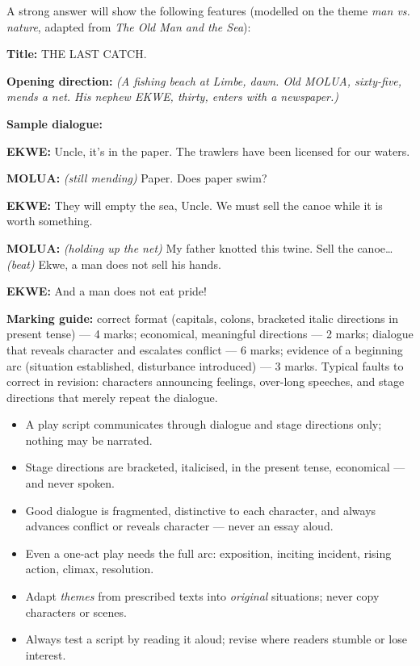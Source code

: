 \documentclass[11pt]{article}
\newcommand{\cle}[1]{{\popxbold\color{popdark}#1}}
\begin{document}
\begin{corrige}
A strong answer will show the following features (modelled on the theme \emph{man vs. nature}, adapted from \emph{The Old Man and the Sea}):\par
\textbf{Title:} THE LAST CATCH.\par
\textbf{Opening direction:} \emph{(A fishing beach at Limbe, dawn. Old MOLUA, sixty-five, mends a net. His nephew EKWE, thirty, enters with a newspaper.)}\par
\textbf{Sample dialogue:}\par
\textbf{EKWE:} Uncle, it's in the paper. The trawlers have been licensed for our waters.\par
\textbf{MOLUA:} \emph{(still mending)} Paper. Does paper swim?\par
\textbf{EKWE:} They will empty the sea, Uncle. We must sell the canoe while it is worth something.\par
\textbf{MOLUA:} \emph{(holding up the net)} My father knotted this twine. Sell the canoe\ldots{} \emph{(beat)} Ekwe, a man does not sell his hands.\par
\textbf{EKWE:} And a man does not eat pride!\par
\textbf{Marking guide:} correct format (capitals, colons, bracketed italic directions in present tense) — 4 marks; economical, meaningful directions — 2 marks; dialogue that reveals character and escalates conflict — 6 marks; evidence of a beginning arc (situation established, disturbance introduced) — 3 marks. Typical faults to correct in revision: characters announcing feelings, over-long speeches, and stage directions that merely repeat the dialogue.
\end{corrige}

\begin{aretenir}
\begin{itemize}
\item A play script communicates through \cle{dialogue} and \cle{stage directions} only; nothing may be narrated.
\item Stage directions are bracketed, italicised, in the present tense, economical — and never spoken.
\item Good dialogue is fragmented, distinctive to each character, and always advances conflict or reveals character — never an essay aloud.
\item Even a one-act play needs the full arc: exposition, inciting incident, rising action, climax, resolution.
\item Adapt \emph{themes} from prescribed texts into \emph{original} situations; never copy characters or scenes.
\item Always test a script by reading it aloud; revise where readers stumble or lose interest.
\end{itemize}
\end{aretenir}
\end{document}
